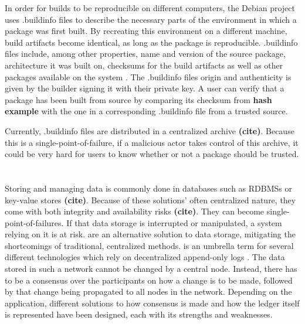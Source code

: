 \documentclass[english, biblatex, digitaloutput]{kththesis}
\begin{document}
In order for builds to be reproducible on different computers, the Debian project uses .buildinfo files to describe the necessary parts of the environment in which a package was first built. By recreating this environment on a different machine, build artifacts become identical, as long as the package is reproducible. .buildinfo files include, among other properties, name and version of the source package, architecture it was built on, checksums for the build artifacts as well as other packages available on the system \cite{lamb_reproducible_2021}. The .buildinfo files origin and authenticity is given by the builder signing it with their private  key. A user can verify that a package has been built from source by comparing its checksum from \textbf{hash example} with the one in a corresponding .buildinfo file from a trusted source.

Currently, .buildinfo files are distributed in a centralized archive \textbf{(cite)}. Because this is a single-point-of-failure, if a malicious actor takes control of this archive, it could be very hard for users to know whether or not a package should be trusted.




\section{}

Storing and managing data is commonly done in databases such as \glspl{RDBMS} or key-value stores \textbf{(cite)}. Because of these solutions' often centralized nature, they come with both integrity and availability risks \textbf{(cite)}. They can become single-point-of-failures. If that data storage is interrupted or manipulated, a system relying on it is at risk.  are an alternative solution to data storage, mitigating the shortcomings of traditional, centralized methods.  is an umbrella term for several different technologies which rely on decentralized append-only logs \cite{kannengieser_trade-offs_2021} . The data stored in such a network cannot be changed by a central node. Instead, there has to be a consensus over the participants on how a change is to be made, followed by that change being propagated to all nodes in the network. Depending on the application, different solutions to how consensus is made and how the ledger itself is represented have been designed, each with its strengths and weaknesses.
\end{document}
